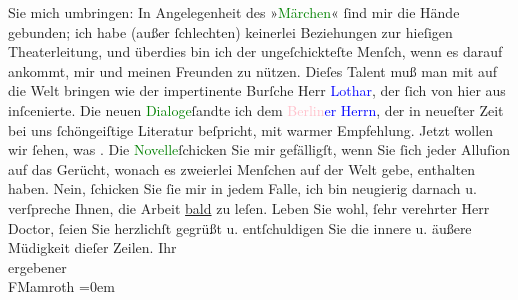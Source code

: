                     Sie mich umbringen: In Angelegenheit des »\textcolor{green}{Märchen}{}\ledrightnote{\textcolor{green}{Das Märchen. Schauspiel in drei Aufzügen}}« ſind mir die Hände gebunden; ich habe (außer ſchlechten)
                    keinerlei Beziehungen zur hieſigen Theaterleitung, und überdies bin ich der
                    ungeſchickteſte Menſch, wenn es darauf ankommt, mir und meinen Freunden zu
                    nützen. Dieſes Talent muß man mit auf die Welt bringen wie der impertinente
                    Burſche Herr \textcolor{blue}{Lothar}{}\ledrightnote{\textcolor{blue}{Rudolf Lothar}}, der ſich \label{K_L00135_1v}\label{K_L00135_1h} von hier aus
                    inſcenierte.\pend
           \pstart
           Die neuen \textcolor{green}{Dialoge}{}ſandte ich
                    dem \textcolor{blue}{\textcolor{pink}{Berlin}{}\ledrightnote{\textcolor{pink}{Berlin}}er Herrn}{}, der in neueſter Zeit
                    bei uns ſchöngeiſtige Literatur beſpricht, mit warmer Empfehlung. Jetzt wollen
                    wir ſehen, was \label{K_L00135_2v}\label{K_L00135_2h}. Die \textcolor{green}{Novelle}{}ſchicken Sie mir
                    gefälligſt, wenn Sie ſich jeder Alluſion {\pb}auf das Gerücht, wonach es zweierlei
                    Menſchen auf der Welt gebe, enthalten haben. Nein, ſchicken Sie ſie mir in jedem
                    Falle, ich bin neugierig darnach u. verſpreche Ihnen, die Arbeit \uline{bald} zu leſen.\pend
           \pstart
           Leben Sie wohl, ſehr verehrter Herr Doctor, ſeien Sie herzlichſt gegrüßt u.
                    entſchuldigen Sie die innere u. äußere Müdigkeit dieſer Zeilen.\pend
           \pstart
           Ihr{\\[\baselineskip]}ergebener{\\[\baselineskip]}\spacefill\mbox{FMamroth}\pend
           \leftskip=0em{}\endnumbering{}  
      